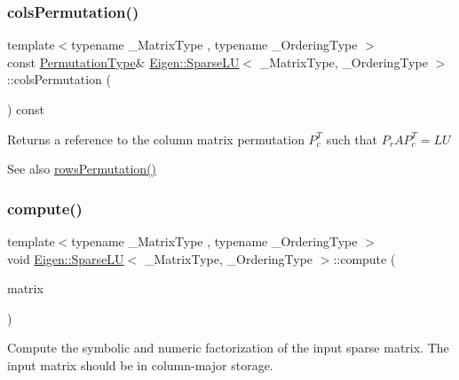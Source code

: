 \subsubsection{\texorpdfstring{colsPermutation()}{colsPermutation()}}
{\footnotesize\ttfamily template$<$typename \+\_\+\+Matrix\+Type , typename \+\_\+\+Ordering\+Type $>$ \\
const \mbox{\hyperlink{class_eigen_1_1_permutation_matrix}{Permutation\+Type}}\& \mbox{\hyperlink{class_eigen_1_1_sparse_l_u}{Eigen\+::\+Sparse\+LU}}$<$ \+\_\+\+Matrix\+Type, \+\_\+\+Ordering\+Type $>$\+::cols\+Permutation (\begin{DoxyParamCaption}{ }\end{DoxyParamCaption}) const\hspace{0.3cm}{\ttfamily [inline]}}

\begin{DoxyReturn}{Returns}
a reference to the column matrix permutation $ P_c^T $ such that $P_r A P_c^T = L U$ 
\end{DoxyReturn}
\begin{DoxySeeAlso}{See also}
\mbox{\hyperlink{class_eigen_1_1_sparse_l_u_a691295e65c06df599876d78ac2c7fada}{rows\+Permutation()}} 
\end{DoxySeeAlso}
\mbox{\label{class_eigen_1_1_sparse_l_u_a96a8dcb02015ab9be5777d4ba9173266}} 
\subsubsection{\texorpdfstring{compute()}{compute()}}
{\footnotesize\ttfamily template$<$typename \+\_\+\+Matrix\+Type , typename \+\_\+\+Ordering\+Type $>$ \\
void \mbox{\hyperlink{class_eigen_1_1_sparse_l_u}{Eigen\+::\+Sparse\+LU}}$<$ \+\_\+\+Matrix\+Type, \+\_\+\+Ordering\+Type $>$\+::compute (\begin{DoxyParamCaption}\item[{const Matrix\+Type \&}]{matrix }\end{DoxyParamCaption})\hspace{0.3cm}{\ttfamily [inline]}}

Compute the symbolic and numeric factorization of the input sparse matrix. The input matrix should be in column-\/major storage. \mbox{\label{class_eigen_1_1_sparse_l_u_a02d63d242d27211b5c5827f5d4fd99ff}} 
